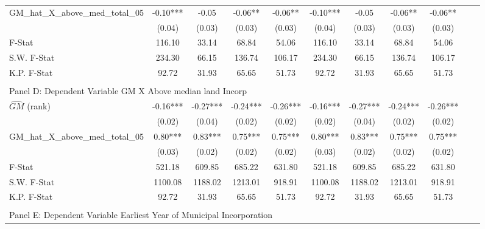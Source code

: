 \begin{table}[htbp]
\begin{threeparttable}
\begin{tabular}{l*{10}{c}}
\addlinespace
GM\_hat\_X\_above\_med\_total\_05&      -0.10***&      -0.05   &      -0.06** &      -0.06** &      -0.10***&      -0.05   &      -0.06** &      -0.06** \\
                &     (0.04)   &     (0.03)   &     (0.03)   &     (0.03)   &     (0.04)   &     (0.03)   &     (0.03)   &     (0.03)   \\
\midrule
F-Stat          &     116.10   &      33.14   &      68.84   &      54.06   &     116.10   &      33.14   &      68.84   &      54.06   \\
S.W. F-Stat     &     234.30   &      66.15   &     136.74   &     106.17   &     234.30   &      66.15   &     136.74   &     106.17   \\
K.P. F-Stat     &      92.72   &      31.93   &      65.65   &      51.73   &      92.72   &      31.93   &      65.65   &      51.73   \\
\cmidrule[\heavyrulewidth](lr){1-9} \\ \cmidrule[\heavyrulewidth](lr){1-9}
\multicolumn{8}{l}{Panel D: Dependent Variable GM X Above median land Incorp}\\
\cmidrule(lr){1-9}
$\hat{GM}$ (rank)&      -0.16***&      -0.27***&      -0.24***&      -0.26***&      -0.16***&      -0.27***&      -0.24***&      -0.26***\\
                &     (0.02)   &     (0.04)   &     (0.02)   &     (0.02)   &     (0.02)   &     (0.04)   &     (0.02)   &     (0.02)   \\
\addlinespace
GM\_hat\_X\_above\_med\_total\_05&       0.80***&       0.83***&       0.75***&       0.75***&       0.80***&       0.83***&       0.75***&       0.75***\\
                &     (0.03)   &     (0.02)   &     (0.02)   &     (0.02)   &     (0.03)   &     (0.02)   &     (0.02)   &     (0.02)   \\
\midrule
F-Stat          &     521.18   &     609.85   &     685.22   &     631.80   &     521.18   &     609.85   &     685.22   &     631.80   \\
S.W. F-Stat     &    1100.08   &    1188.02   &    1213.01   &     918.91   &    1100.08   &    1188.02   &    1213.01   &     918.91   \\
K.P. F-Stat     &      92.72   &      31.93   &      65.65   &      51.73   &      92.72   &      31.93   &      65.65   &      51.73   \\
\cmidrule[\heavyrulewidth](lr){1-9} \\ \cmidrule[\heavyrulewidth](lr){1-9}
\multicolumn{8}{l}{Panel E: Dependent Variable Earliest Year of Municipal Incorporation}\\

\end{tabular}
\end{threeparttable}
\end{table}

